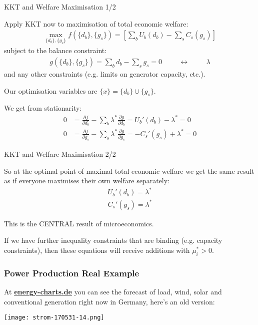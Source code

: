 \documentclass[10pt,aspectratio=169,dvipsnames]{beamer}
\def\l{\lambda}
\def\m{\mu}
\def\d{\partial}
\begin{document}
\begin{frame}{KKT and Welfare Maximisation 1/2}

  Apply KKT now to maximisation of total economic welfare:
  \begin{align*}
    \max_{\{d_b\}, \{g_s\}} f(\{d_b\}, \{g_s\}) = \left[ \sum_b U_b (d_b)  -  \sum_s C_s (g_s) \right]
  \end{align*}
  subject to the balance constraint:
  \begin{align*}
    g(\{d_b\}, \{g_s\}) = \sum_b d_b -  \sum_s g_s  = 0 \hspace{1cm} \leftrightarrow \hspace{1cm} \l
  \end{align*}
  and any other constraints (e.g. limits on generator capacity, etc.).

  Our optimisation variables are $\{x\} = \{d_b\} \cup \{g_s\}$.

  We get from stationarity:
  \begin{align*}
    0 & =   \frac{\d f}{\d d_b} - \sum_b \l^* \frac{\d g}{\d d_b} = U_b'(d_b) - \l^* = 0 \\
    0 & =   \frac{\d f}{\d g_s} - \sum_s \l^* \frac{\d g}{\d g_s} = -C_s'(g_s) + \l^* = 0
  \end{align*}


\end{frame}





\begin{frame}{KKT and Welfare Maximisation 2/2}

  So at the optimal point of maximal total economic welfare we get the
  same result as if everyone maximises their own welfare separately:
  \begin{align*}
 U_b'(d_b) =  \l^*  \\
 C_s'(g_s) = \l^*
  \end{align*}

  This is the CENTRAL result of microeconomics.

  If we have further inequality constraints that are binding (e.g. capacity constraints), then
  these equations will receive additions with $\m_i^* > 0$.


\end{frame}



\begin{frame}[fragile]
  \frametitle{Power Production Real Example}

  At \href{https://energy-charts.de/power_de.htm}{\bf\color{blue}\underline{energy-charts.de}}  you can see the forecast of load, wind, solar and conventional generation right now in Germany, here's an old version:


  \centering
    \texttt{[image: strom-170531-14.png]}


\end{frame}
\end{document}
